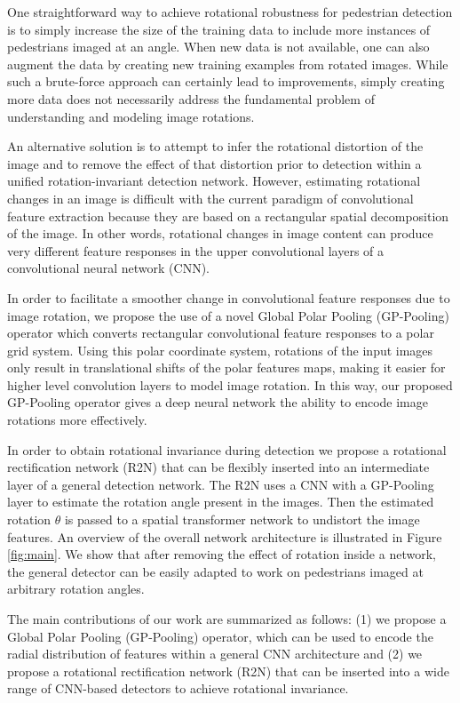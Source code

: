 \documentclass[10pt,twocolumn,letterpaper]{article}
\begin{document}
One straightforward way to achieve rotational robustness for pedestrian detection is to simply increase the size of the training data to include more instances of pedestrians imaged at an angle. When new data is not available, one can also augment the data \cite{VanDyk2001} by creating new training examples from rotated images. While such a brute-force approach can certainly lead to improvements, simply creating more data does not necessarily address the fundamental problem of understanding and modeling image rotations.


An alternative solution is to attempt to infer the rotational distortion of the image and to remove the effect of that distortion prior to detection within a unified rotation-invariant detection network. However, estimating rotational changes in an image is difficult with the current paradigm of convolutional feature extraction because they are based on a rectangular spatial decomposition of the image. In other words, rotational changes in image content can produce very different feature responses in the upper convolutional layers of a convolutional neural network (CNN). 

In order to facilitate a smoother change in convolutional feature responses due to image rotation, we propose the use of a novel Global Polar Pooling (GP-Pooling) operator which converts rectangular convolutional feature responses to a polar grid system. Using this polar coordinate system, rotations of the input images only result in translational shifts of the polar features maps, making it easier for higher level convolution layers to model image rotation. In this way, our proposed GP-Pooling operator gives a deep neural network the ability to encode image rotations more effectively. 

In order to obtain rotational invariance during detection we propose a rotational rectification network (R2N) that can be flexibly inserted into an intermediate layer of a general detection network. The R2N uses a CNN with a GP-Pooling layer to estimate the rotation angle present in the images. Then the estimated rotation $\theta$ is passed to a spatial transformer network to undistort the image features. An overview of the overall network architecture is illustrated in Figure \ref{fig:main}. We show that after removing the effect of rotation inside a network, the general detector can be easily adapted to work on pedestrians imaged at arbitrary rotation angles.

The main contributions of our work are summarized as follows: (1) we propose a Global Polar Pooling (GP-Pooling) operator, which can be used to encode the radial distribution of features within a general CNN architecture and (2) we propose a rotational rectification network (R2N) that can be inserted into a wide range of CNN-based detectors to achieve rotational invariance.
\end{document}

